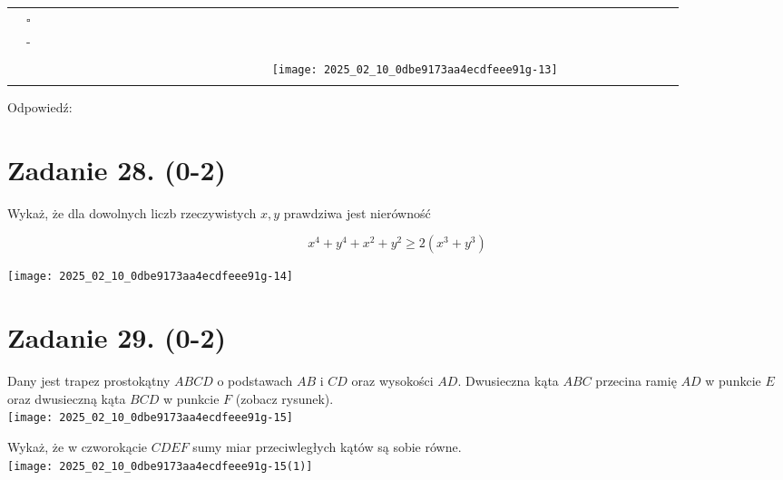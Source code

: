 \documentclass[10pt]{article}
\begin{document}
\begin{center}
\begin{tabular}{|c|c|c|c|c|c|c|c|c|c|c|c|c|c|c|c|c|c|c|c|c|c|c|c|c|c|c|c|c|c|}
\hline
 &  &  &  &  &  &  &  &  &  &  &  &  &  &  &  &  &  &  &  &  &  &  &  &  &  &  &  &  &  \\
\hline
 & \(\square\) &  &  &  &  &  &  &  &  &  &  &  &  &  &  &  &  &  &  &  &  &  &  &  &  &  &  &  &  \\
\hline
 & - &  &  &  &  &  &  &  &  &  &  &  &  &  &  &  &  &  &  &  &  &  &  &  &  &  &  &  &  \\
\hline
 &  &  &  &  &  &  &  &  &  &  &  &  &  &  &  &  &  &  &  &  &  &  &  &  &  &  &  &  &  \\
\hline
 &  &  &  &  &  &  &  &  &  &  &  &  &  &  &  &  &  &  &  & \texttt{[image: 2025\_02\_10\_0dbe9173aa4ecdfeee91g-13]}
 &  &  &  &  &  &  &  &  &  \\
\hline
 &  &  &  &  &  &  &  &  &  &  &  &  &  &  &  &  &  &  &  &  &  &  &  &  &  &  &  &  &  \\
\hline
\end{tabular}
\end{center}

Odpowiedź: \(\qquad\)

\section*{Zadanie 28. (0-2)}
Wykaż, że dla dowolnych liczb rzeczywistych \(x, y\) prawdziwa jest nierówność

\[
x^{4}+y^{4}+x^{2}+y^{2} \geq 2\left(x^{3}+y^{3}\right)
\]

\begin{center}
\texttt{[image: 2025\_02\_10\_0dbe9173aa4ecdfeee91g-14]}
\end{center}

\section*{Zadanie 29. (0-2)}
Dany jest trapez prostokątny \(A B C D\) o podstawach \(A B\) i \(C D\) oraz wysokości \(A D\). Dwusieczna kąta \(A B C\) przecina ramię \(A D\) w punkcie \(E\) oraz dwusieczną kąta \(B C D\) w punkcie \(F\) (zobacz rysunek).\\
\texttt{[image: 2025\_02\_10\_0dbe9173aa4ecdfeee91g-15]}

Wykaż, że w czworokącie \(C D E F\) sumy miar przeciwległych kątów są sobie równe.\\
\texttt{[image: 2025\_02\_10\_0dbe9173aa4ecdfeee91g-15(1)]}
\end{document}
